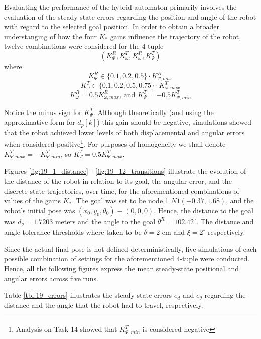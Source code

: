 Evaluating the performance of the hybrid automaton primarily involves the
evaluation of the steady-state errors regarding the position and angle of the
robot with regard to the selected goal position. In order to obtain a broader
understanging of how the four $K_{*}$ gains influence the trajectory of the
robot, twelve combinations were considered for the 4-tuple
$$(K_{\Psi}^R, K_{\omega}^T, K_{\omega}^R, K_{\Psi}^T)$$
where
$$K_{\Psi}^R \in \{0.1,0.2,0.5\} \cdot K_{\Psi,max}^R$$
$$K_{\omega}^T \in \{0.1,0.2,0.5,0.75\} \cdot K_{\omega,max}^T$$
$$K_{\omega}^R = 0.5 K_{\omega,max}^R \text{, and } K_{\Psi}^T = -0.5 K_{\Psi,min}^T$$

Notice the minus sign for $K_{\Psi}^T$. Although theoretically (and using the
approximative form for $d_p[k]$) this gain should be negative, simulations
showed that the robot achieved lower levels of both displacemental and angular
errors when considered positive\footnote{Analysis on Task 14 showed that
$K_{\Psi,min}^T$ is considered negative}. For purposes of homogeneity we shall
denote $K_{\Psi,max}^T = -K_{\Psi,min}^T$, so $K_{\Psi}^T = 0.5 K_{\Psi,max}^T$.

Figures \ref{fig:19_1_distance} - \ref{fig:19_12_transitions} illustrate the
evolution of the distance of the robot in relation to its goal, the angular
error, and the discrete state trajectories, over time, for the aforementioned
combinations of values of the gains $K_{*}$. The goal was set to be node 1
$N1(-0.37, 1.68)$, and the robot's initial pose was
$(x_0, y_0, \theta_0) \equiv (0,0,0)$. Hence, the distance to the goal was
$d_g = 1.7203$ meters and the angle to the goal $\theta^R = 102.42^{\circ}$. The
distance and angle tolerance thresholds where taken to be $\delta = 2\text{ cm}$
and $\xi = 2^{\circ}$ respectively.

Since the actual final pose is not defined deterministically, five simulations
of each possible combination of settings for the aforementioned 4-tuple were
conducted. Hence, all the following figures express the mean steady-state
positional and angular errors across five runs.

Table \ref{tbl:19_errors} illustrates the steady-state errors $e_d$ and
$e_{\theta}$ regarding the distance and the angle that the robot had to travel,
respectively.


